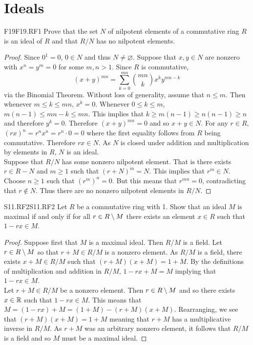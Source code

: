 \documentclass[../AlgebraQualSolutions.tex]{subfiles}
\begin{document}
\section{Ideals}

	\begin{prob}{F19}{F19.RF1}
	Prove that the set $N$ of nilpotent elements of a commutative ring $R$ is an ideal of $R$ and that $R/N$ has no nilpotent elements.
	\end{prob}
	
	\begin{proof}
	Since $0^1 = 0$, $0 \in N$ and thus $N \neq \varnothing$. Suppose that $x,y \in N$ are nonzero with $x^n = y^m = 0$ for some $m,n > 1$. Since $R$ is commutative,
		\[(x+y)^{mn} = \sum_{k=0}^{mn} {mn \choose k} x^k y^{mn - k} \]
	via the Binomial Theorem. Without loss of generality, assume that $n \leq m$. Then whenever $m \leq k \leq mn$, $x^k = 0$. Whenever $0 \leq k \leq m$, $m(n - 1) \leq mn - k \leq mn$. This implies that $k \geq m(n-1) \geq n(n-1) \geq n$ and therefore $y^k = 0$. Therefore $(x+y)^{mn} = 0$ and so $x + y \in N$. For any $r \in R$, $(rx)^n = r^nx^n = r^n \cdot 0 = 0$ where the first equality follows from $R$ being commutative. Therefore $rx \in N$. As $N$ is closed under addition and multiplication by elements in $R$, $N$ is an ideal.\\
	
	Suppose that $R/N$ has some nonzero nilpotent element. That is there exists $r \in R - N$ and $m \geq 1$ such that $(r+N)^m = N$. This implies that $r^m \in N$. Choose $n \geq 1$  such that $(r^m)^n = 0$. But this means that $r^{mn} = 0$, contradicting that $r \not\in N$. Thus there are no nonzero nilpotent elements in $R/N$.
	\end{proof}

\begin{prob}{S11.RF2}{S11.RF2}
	Let $R$ be a commutative ring with 1. Show that an ideal $M$ is maximal if and only if for all $r \in R \setminus M$ there exists an element $x \in R$ such that $1 - rx \in M$.
\end{prob}

\begin{proof}
	Suppose first that $M$ is a maximal ideal. Then $R/M$ is a field. Let $r \in R \setminus M$ so that $r + M \in R/M$ is a nonzero element. As $R/M$ is a field, there exists $x + M \in R/M$ such that $(r + M)(x + M) = 1 + M$. By the definitions of multiplication and addition in $R/M$, $1 - rx + M = M$ implying that $1 - rx \in M$.\\

	Let $r + M \in R/M$ be a nonzero element. Then $r \in R \setminus M$ and so there exists $x \in \mathbb{R}$ such that $1 - rx \in M$. This means that $M = (1 - rx) + M = (1 + M) - (r + M)(x + M)$. Rearranging, we see that $(r + M)(x + M) = 1 + M$ meaning that $r + M$ has a multiplicative inverse in $R/M$. As $r + M$ was an arbitrary nonzero element, it follows that $R/M$ is a field and so $M$ must be a maximal ideal.
\end{proof}
\end{document}
